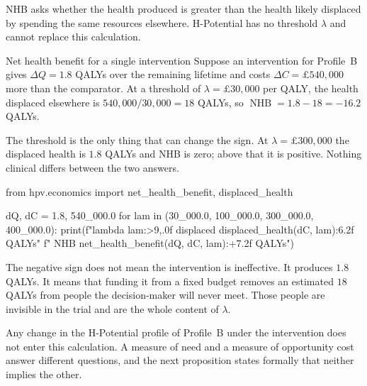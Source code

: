 \begin{remark}
NHB asks whether the health produced is greater than the health likely displaced
by spending the same resources elsewhere. H-Potential has no threshold
$\lambda$ and cannot replace this calculation.
\end{remark}

\begin{workedexample}{Net health benefit for a single intervention}
Suppose an intervention for Profile~B gives $\Delta Q=1.8$ QALYs over the
remaining lifetime and costs $\Delta C=\pounds 540{,}000$ more than the
comparator. At a threshold of $\lambda=\pounds 30{,}000$ per QALY, the health
displaced elsewhere is $540{,}000/30{,}000=18$ QALYs, so
$\operatorname{NHB}=1.8-18=-16.2$ QALYs.

The threshold is the only thing that can change the sign. At
$\lambda=\pounds 300{,}000$ the displaced health is $1.8$ QALYs and
NHB is zero; above that it is positive. Nothing clinical differs
between the two answers.

\begin{wecode}[Python]
from hpv.economics import net_health_benefit, displaced_health

dQ, dC = 1.8, 540_000.0
for lam in (30_000.0, 100_000.0, 300_000.0, 400_000.0):
    print(f"lambda {lam:>9,.0f}  displaced {displaced_health(dC, lam):6.2f} QALYs"
          f"   NHB {net_health_benefit(dQ, dC, lam):+7.2f} QALYs")
\end{wecode}

\end{workedexample}

\begin{reading}
The negative sign does not mean the intervention is
ineffective. It produces $1.8$ QALYs. It means that funding it from a fixed
budget removes an estimated $18$ QALYs from people the decision-maker will
never meet. Those people are invisible in the trial and are the whole content
of $\lambda$.

Any change in the H-Potential profile of Profile~B under the intervention
does not enter this calculation. A measure of need and a measure of
opportunity cost answer different questions, and the next proposition states
formally that neither implies the other.
\end{reading}

